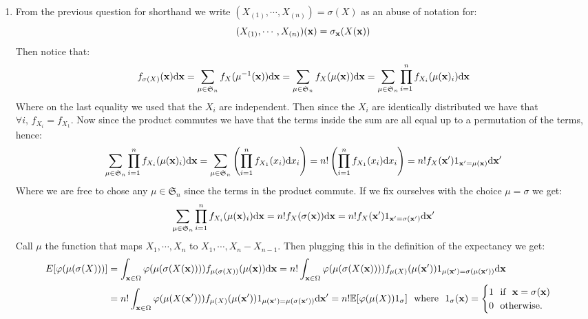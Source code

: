 \documentclass[10pt,a4paper]{article}
\begin{document}
\begin{enumerate}
\item From the previous question for shorthand we write $(X_{(1)}, \cdots, X_{(n)}) = \sigma(X)$ as an abuse of notation for: 
\[
(X_{(1)}, \cdots, X_{(n)})(\vb{x}) = \sigma_{\vb{x}}(X(\vb{x}))
\]
Then notice that:
\[
f_{\sigma(X)}(\vb{x}) \dd \vb{x} = \sum_{\mu \in \mathfrak{S}_n} f_X(\mu^{-1}(\vb{x})) \dd \vb{x} = \sum_{\mu \in \mathfrak{S}_n} f_X(\mu(\vb{x})) \dd \vb{x} = \sum_{\mu \in \mathfrak{S}_n} \prod_{i = 1}^n f_{X_i}(\mu(\vb{x})_i) \dd \vb{x}
\]
Where on the last equality we used that the $X_i$ are independent. Then since the $X_i$ are identically distributed we have that $\forall i, \, f_{X_i} = f_{X_1}$. Now since the product commutes we have that the terms inside the sum are all equal up to a permutation of the terms, hence:
\[
\sum_{\mu \in \mathfrak{S}_n} \prod_{i = 1}^n f_{X_i}(\mu(\vb{x})_i) \dd \vb{x} = \sum_{\mu \in \mathfrak{S}_n} \left( \prod_{i = 1}^n f_{X_1}(x_i) \dd x_i \right) = n!\left( \prod_{i = 1}^n f_{X_1}(x_i) \dd x_i \right) = n! f_X(\vb{x'}) 1_{\vb{x'} = \mu(\vb{x})} \dd \vb{x'}
\]
Where we are free to chose any $\mu \in \mathfrak{S}_n$ since the terms in the product commute. If we fix ourselves with the choice $\mu = \sigma$ we get:
\[
\sum_{\mu \in \mathfrak{S}_n} \prod_{i = 1}^n f_{X_i}(\mu(\vb{x})_i) \dd \vb{x} = n! f_X(\sigma(\vb{x})) \dd \vb{x} = n! f_X(\vb{x'}) 1_{\vb{x'} = \sigma(\vb{x'})} \dd \vb{x'}
\]
Call $\mu$ the function that maps $X_1, \cdots, X_n$ to $X_1, \cdots, X_n - X_{n-1}$. Then plugging this in the definition of the expectancy we get:
\begin{align*}
E[\varphi(\mu(\sigma(X)))] &= \int_{\vb{x} \in \Omega} \varphi(\mu(\sigma(X(\vb{x})))) f_{\mu(\sigma(X))}(\mu(\vb{x})) \dd \vb{x} = n! \int_{\vb{x} \in \Omega} \varphi(\mu(\sigma(X(\vb{x})))) f_{\mu(X)}(\mu(\vb{x'})) 1_{\mu(\vb{x'}) = \sigma(\mu(\vb{x'}))} \dd \vb{x}\\
&= n! \int_{\vb{x} \in \Omega} \varphi(\mu(X(\vb{x'}))) f_{\mu(X)}(\mu(\vb{x'})) 1_{\mu(\vb{x'}) = \mu(\sigma(\vb{x'}))} \dd \vb{x'} = n! \mathbb{E}[\varphi(\mu(X)) 1_{\sigma}] \mbox{~~where~~} 1_\sigma(\vb{x}) = \begin{cases}
1 \mbox{~~if~~} \vb{x} = \sigma(\vb{x})\\
0 \mbox{~~otherwise.}
\end{cases}
\end{align*}


\end{enumerate}
\end{document}
